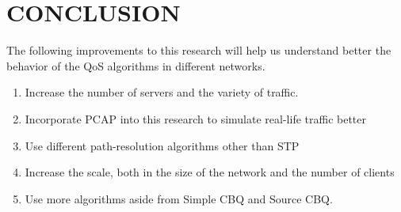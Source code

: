 \chapter{CONCLUSION}



The following improvements to this research will help us understand better the behavior of the QoS algorithms in different networks.
\begin{enumerate}
    \item Increase the number of servers and the variety of traffic.
    \item Incorporate PCAP into this research to simulate real-life traffic better
    \item Use different path-resolution algorithms other than STP
    \item Increase the scale, both in the size of the network and the number of clients
    \item Use more algorithms aside from Simple CBQ and Source CBQ.
\end{enumerate}
